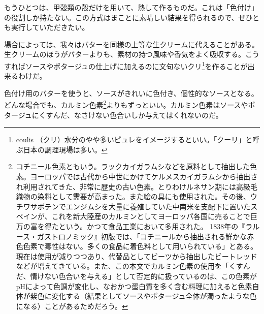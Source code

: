もうひとつは、甲殻類の殻だけを用いて、熱して作るものだ。これは「色付け」の役割しか持たない。この方式はまことに素晴しい結果を得られるので、ぜひとも実行していただきたい。

場合によっては、我々はバターを同様の上等な生クリームに代えることがある。生クリームのほうがバターよりも、素材の持つ風味や香気をよく吸収する。こうすればソースやポタージュの仕上げに加えるのに文句ないクリ\footnote{coulis
  （クリ）水分のやや多いピュレをイメージするといい。「クーリ」と呼ぶ日本の調理現場は多い。}を作ることが出来るわけだ。

色付け用のバターを使うと、ソースがきれいに色付き、個性的なソースとなる。どんな場合でも、カルミン色素\footnote{コチニール色素ともいう。ラックカイガラムシなどを原料として抽出した色素。ヨーロッパでは古代から中世にかけてケルメスカイガラムシから抽出され利用されてきた、非常に歴史の古い色素。とりわけルネサン期には高級毛織物の染料として需要が高まった。また絵の具にも使用された。その後、ウチワサボテンでエンジムシを大量に養殖していた中南米を支配下に置いたスペインが、これを新大陸産のカルミンとしてヨーロッパ各国に売ることで巨万の富を得たという。かつて食品工業において多用された。
  1838年の『ラルース・ガストロノミック』初版では、「コチニールから抽出される鮮かな赤色色素で毒性はない。多くの食品に着色料として用いられている」とある。現在は使用が減りつつあり、代替品としてビーツから抽出したビートレッドなどが増えてきている。また、この本文でカルミン色素の使用を「くすんだ、情けない色合いを与える」として否定的に扱っているのは、この色素がpHによって色調が変化し、なおかつ蛋白質を多く含む料理に加えると色素自体が紫色に変化する（結果としてソースやポタージュ全体が濁ったような色になる）ことがあるためだろう。}よりもずっといい。カルミン色素はソースやポタージュにくすんだ、なさけない色合いしか与えてはくれないのだ。


